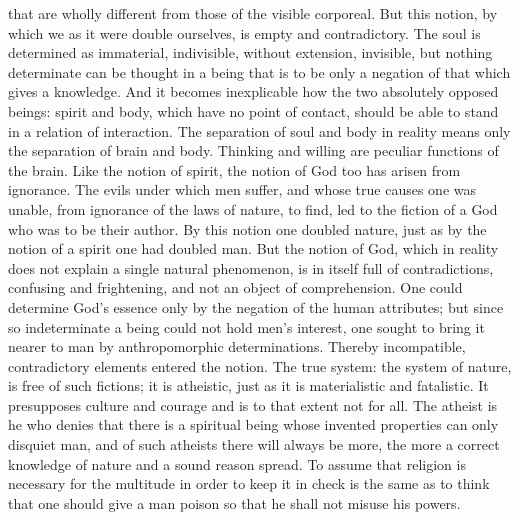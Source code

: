 that are wholly different from those of the visible corporeal. But this
notion, by which we as it were double ourselves, is empty and
contradictory. The soul is determined as immaterial, indivisible,
without extension, invisible, but nothing determinate can be thought in
a being that is to be only a negation of that which gives a knowledge.
And it becomes inexplicable how the two absolutely opposed beings:
spirit and body, which have no point of contact, should be able to
stand in a relation of interaction. The separation of soul and body in
reality means only the separation of brain and body. Thinking and
willing are peculiar functions of the brain. Like the notion of
spirit, the notion of God too has arisen from ignorance. The
evils under which men suffer, and whose true causes one was unable,
from ignorance of the laws of nature, to find, led to the fiction of a
God who was to be their author. By this notion one doubled nature, just
as by the notion of a spirit one had doubled man. But the notion of
God, which in reality does not explain a single natural phenomenon, is
in itself full of contradictions, confusing and frightening, and not an
object of comprehension. One could determine God's essence only by the
negation of the human attributes; but since so indeterminate a being
could not hold men's interest, one sought to bring it nearer to man by
anthropomorphic determinations. Thereby incompatible, contradictory
elements entered the notion. The true system: the system of nature, is
free of such fictions; it is atheistic, just as it is materialistic and
fatalistic. It presupposes culture and courage and is to that extent
not for all. The atheist is he who denies that there is a spiritual
being whose invented properties can only disquiet man, and of such
atheists there will always be more, the more a correct knowledge of
nature and a sound reason spread. To assume that religion is necessary
for the multitude in order to keep it in check is the same as to think
that one should give a man poison so that he shall not misuse his
powers.

